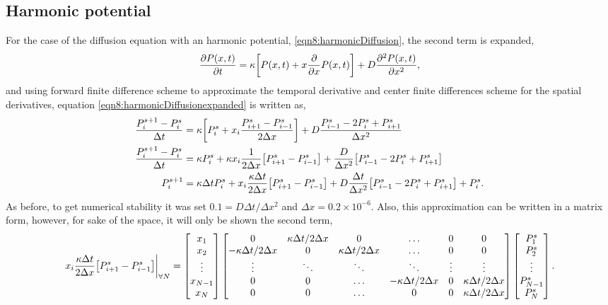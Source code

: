 \documentclass[main.tex]{subfiles}
\begin{document}
\subsection{Harmonic potential}

For the case of the diffusion equation with an harmonic potential, \eqref{eqn8:harmonicDiffusion}, the second term is expanded,
\begin{gather*}
    \pdv{P\qty(x,t)}{t} = \kappa\qty[P\qty(x,t) + x\pdv{x}P\qty(x,t)] + D\pdv[2]{P(x,t)}{x}\label{eqn8:harmonicDiffusionexpanded},
\end{gather*}
and using forward finite difference scheme to approximate the temporal derivative and center finite differences scheme for the spatial derivatives, equation \eqref{eqn8:harmonicDiffusionexpanded} is written as,
\begin{align*}
    \frac{P_{i}^{s+1} - P_i^s}{\Delta t} &= \kappa\qty[P_i^s + x_{i}\frac{P_{i+1}^s - P_{i-1}^s}{2\Delta x} ] + D\frac{P_{i-1}^s -2 P_i^s + P_{i+1}^s}{\Delta x^2} \\
    \frac{P_{i}^{s+1} - P_i^s}{\Delta t} &= \kappa P_i^s + \kappa x_{i}\frac{1}{2\Delta x}\qty[P_{i+1}^s - P_{i-1}^s] + \frac{D}{\Delta x^2}\qty[P_{i-1}^s -2 P_i^s + P_{i+1}^s] \\
    P_i^{s+1} &= \kappa\Delta t P_i^s + x_{i}\frac{\kappa\Delta t}{2\Delta x}\qty[P_{i+1}^s - P_{i-1}^s] + D\frac{\Delta t}{\Delta x^2}\qty[P_{i-1}^s -2 P_i^s + P_{i+1}^s] + P_i^s.
\end{align*}
As before, to get numerical stability it was set $0.1=D\Delta t/\Delta x^2$ and $\Delta x = 0.2\times10^{-6}$.
Also, this approximation can be written in a matrix form, however, for sake of the space, it will only be shown the second term,
\begin{gather*}
    \left.x_{i}\frac{\kappa\Delta t}{2\Delta x}\qty[P_{i+1}^s - P_{i-1}^s]\right|_{\forall N} = 
    \begin{bmatrix}
        x_1 \\
        x_2 \\
        \vdots \\
        x_{N-1} \\
        x_N
    \end{bmatrix}
    \begin{bmatrix}
        0 & \kappa\Delta t/2\Delta x & 0 & \dots &  0 & 0 \\
        -\kappa\Delta t/2\Delta x & 0 & \kappa\Delta t/2\Delta x & \dots &  0 & 0 \\
        \vdots & \ddots & \ddots & \ddots & \vdots & \vdots \\
        0 & 0 & \dots & -\kappa\Delta t/2\Delta x & 0 & \kappa\Delta t/2\Delta x \\
        0 & 0 & \dots & 0 & 0 & \kappa\Delta t/2\Delta x \\
    \end{bmatrix}
    \begin{bmatrix}
        P_{1}^{s} \\
        P_{2}^{s} \\
        \vdots \\
        P_{N-1}^{s} \\
        P_{N}^{s}
    \end{bmatrix}.
\end{gather*}
\end{document}
